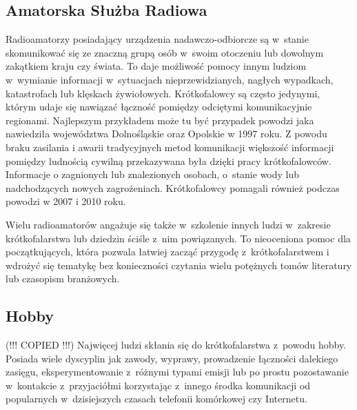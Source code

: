 \documentclass[]{mgr}
\begin{document}
            \subsection{Amatorska Służba Radiowa}
            Radioamatorzy posiadający urządzenia nadawczo-odbiorcze są w~stanie skomunikować się ze znaczną grupą osób w~swoim otoczeniu lub dowolnym zakątkiem kraju czy świata. To daje możliwość pomocy innym ludziom w~wymianie informacji w~sytuacjach nieprzewidzianych, nagłych wypadkach, katastrofach lub klęskach żywiołowych. Krótkofalowcy są często jedynymi, którym udaje się nawiązać łączność pomiędzy odciętymi komunikacyjnie regionami. Najlepszym przykładem może tu być przypadek powodzi jaka nawiedziła województwa Dolnośląskie oraz Opolskie w 1997 roku. Z powodu braku zasilania i awarii tradycyjnych metod komunikacji większość informacji pomiędzy ludnością cywilną przekazywana była dzięki pracy krótkofalowców. Informacje o zagnionych lub znalezionych osobach, o~stanie wody lub nadchodzących nowych zagrożeniach. Krótkofalowcy pomagali również podczas powodzi w 2007 i 2010 roku.

            Wielu radioamatorów angażuje się także w~szkolenie innych ludzi w~zakresie krótkofalarstwa lub dziedzin ściśle z~nim powiązanych. To nieoceniona pomoc dla początkujących, która pozwala łatwiej zacząć przygodę z~krótkofalarstwem i wdrożyć się tematykę bez konieczności czytania wielu potężnych tomów literatury lub czasopism branżowych.

            \subsection{Hobby}
            (!!! COPIED !!!) Najwięcej ludzi skłania się do krótkofalarstwa z~powodu hobby. Posiada wiele dyscyplin jak zawody, wyprawy, prowadzenie łączności dalekiego zasięgu, eksperymentowanie z~różnymi typami emisji lub po prostu pozostawanie w~kontakcie z~przyjaciółmi korzystając z~innego środka komunikacji od popularnych w~dzisiejszych czasach telefonii komórkowej czy Internetu.
\end{document}

